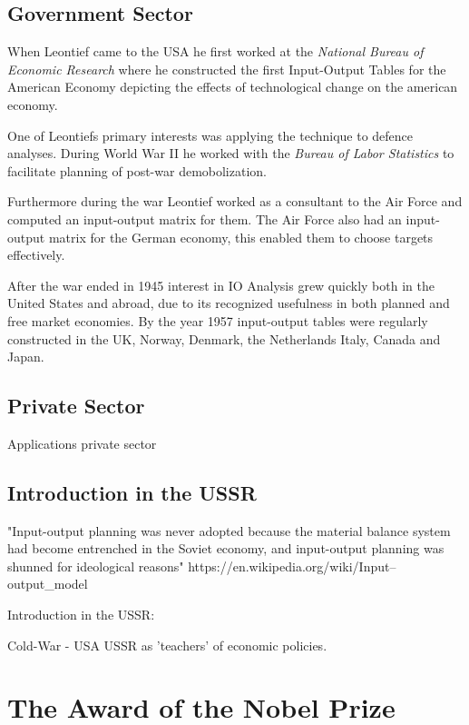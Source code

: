\documentclass[12pt,a4paper]{scrartcl}
\begin{document}
	\subsection{Government Sector}
	
	When Leontief came to the USA he first worked at the\textit{ National Bureau of Economic Research} where he constructed the first Input-Output Tables for the American Economy depicting the effects of technological change on the american economy.
	
	One of Leontiefs primary interests was applying the technique to defence analyses. During World War II he worked with the \textit{Bureau of Labor Statistics} to facilitate planning of post-war demobolization.
	
	Furthermore during the war Leontief worked as a consultant to the Air Force and computed an input-output matrix for them. The Air Force also had an input-output matrix for the German economy, this enabled them to choose targets effectively.
	
	After the war ended in 1945 interest in IO Analysis grew quickly both in the United States and abroad, due to its recognized usefulness in both planned and free market economies. By the year 1957 input-output tables were regularly constructed in the UK, Norway, Denmark, the Netherlands Italy, Canada and Japan.
	
	\subsection{Private Sector}
	
	Applications private sector 
	
	\subsection{Introduction in the USSR} \label{ussr}
	"Input-output planning was never adopted because the material balance system had become entrenched in the Soviet economy, and input-output planning was shunned for ideological reasons" 
	 https://en.wikipedia.org/wiki/Input–output\_model
	
	Introduction in the USSR: \cite{leontief1960niedergang}
	
	Cold-War - USA USSR as 'teachers' of economic policies.\newline
	
	\section{The Award of the Nobel Prize} \label{nobelprize}
	
\end{document}
